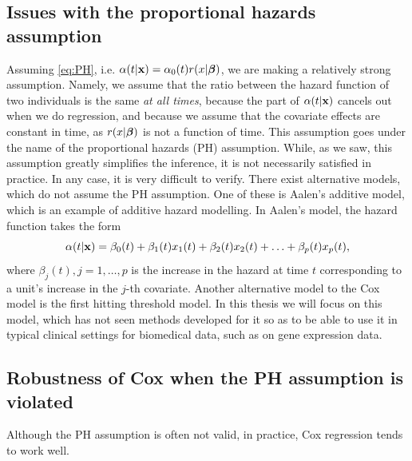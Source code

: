 \subsection{Issues with the proportional hazards assumption}
Assuming \eqref{eq:PH}, i.e. $\alpha(t|\mathbf{x})=\alpha_0(t)r(x|\boldsymbol{\beta})$, we are making a relatively strong assumption. Namely, we assume that the ratio between the hazard function of two individuals is the same \textit{at all times}, because the part of $\alpha(t|\mathbf{x})$ cancels out when we do regression, and because we assume that the covariate effects are constant in time, as $r(x|\boldsymbol{\beta})$ is not a function of time.
This assumption goes under the name of the proportional hazards (PH) assumption. While, as we saw, this assumption greatly simplifies the inference, it is not necessarily satisfied in practice. In any case, it is very difficult to verify. There exist alternative models, which do not assume the PH assumption. One of these is Aalen's additive model, which is an example of additive hazard modelling. In Aalen's model, the hazard function takes the form
\begin{equation}
    \alpha(t|\mathbf{x})=\beta_0(t)+\beta_1(t)x_1(t)+\beta_2(t)x_2(t)+\ldots+\beta_p(t)x_p(t),
\end{equation}
where $\beta_j(t),j=1,\ldots,p$ is the increase in the hazard at time $t$ corresponding to a unit's increase in the $j$-th covariate. Another alternative model to the Cox model is the first hitting threshold model. In this thesis we will focus on this model, which has not seen methods developed for it so as to be able to use it in typical clinical settings for biomedical data, such as on gene expression data.

\subsection{Robustness of Cox when the PH assumption is violated}
Although the PH assumption is often not valid, in practice, Cox regression tends to work well. 

